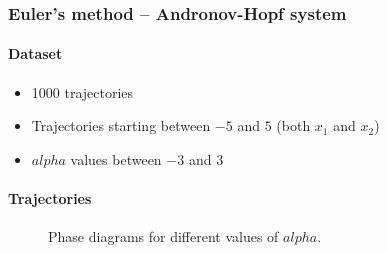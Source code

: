 \begin{frame}
	\frametitle{Euler's method -- Andronov-Hopf system}
	\paragraph{Dataset}\vspace{-2mm}
	\begin{itemize}
		\item 1000 trajectories
		\item Trajectories starting between $-5$ and $5$ (both $x_1$ and $x_2$)
		\item $alpha$ values between $-3$ and $3$
	\end{itemize}
	\paragraph{Trajectories}\vspace{-2mm}
	\begin{figure}[H]
		\quad
		\quad
		\caption{Phase diagrams for different values of $alpha$.}
	\end{figure}
\end{frame}

